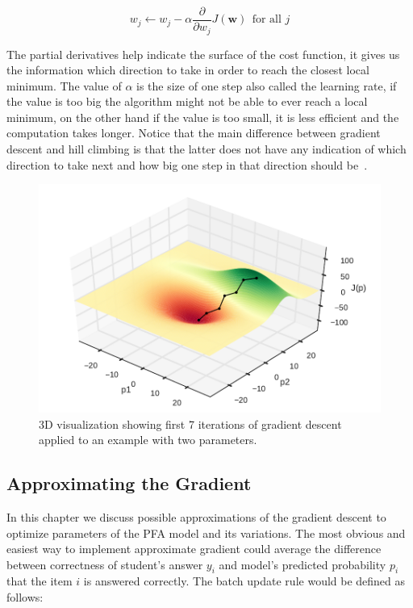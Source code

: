 \begin{equation} \label{cost-function-update}
  w_j \gets w_j - \alpha \frac{\partial}{\partial w_j} J(\mathbf{w})~~\text{for all } j
\end{equation}

The partial derivatives help indicate the surface of the cost function, it gives us the information which direction to take in order to reach the closest local minimum. The value of $\alpha$ is the size of one step also called the learning rate, if the value is too big the algorithm might not be able to ever reach a local minimum, on the other hand if the value is too small, it is less efficient and the computation takes longer. Notice that the main difference between gradient descent and hill climbing is that the latter does not have any indication of which direction to take next and how big one step in that direction should be~\cite{Russell2009}.

\begin{figure}[htbp]
  \centering
  \includegraphics[width=\textwidth]{img/gradient-descent}
  \caption{3D visualization showing first 7 iterations of gradient descent applied to an example with two parameters.}
  \label{fig-gradient-descent}
\end{figure}

\subsection{Approximating the Gradient}
\label{approx-gradient}

In this chapter we discuss possible approximations of the gradient descent to optimize parameters of the PFA model and its variations. The most obvious and easiest way to implement approximate gradient could average the difference between correctness of student's answer $y_i$ and model's predicted probability $p_i$ that the item $i$ is answered correctly. The batch update rule would be defined as follows:

